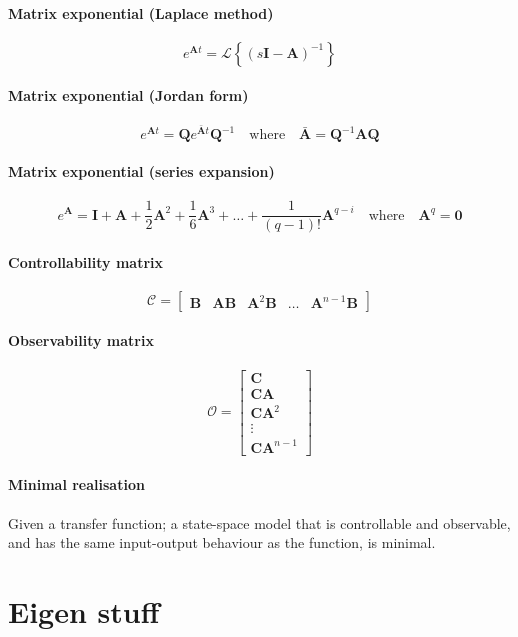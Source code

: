 \documentclass[a4paper]{article}
\newcommand{\M}[1]{\bm{#1}}
\newcommand{\Mc}[1]{\mathbf{#1}}
\newcommand{\lagrange}{\mathscr{L}}
\begin{document}
\paragraph{Matrix exponential (Laplace method)}
$$e^{\M{A}t} = \lagrange \left\{ (s\Mc{I}-\M{A})^{-1} \right\}$$

\paragraph{Matrix exponential (Jordan form)}
$$e^{\M{A}t} = \M{Q} e^{\bar{\M{A}}t} \M{Q}^{-1} \quad \text{where} \quad \bar{\M{A}} = \M{Q}^{-1}\M{AQ}$$

\paragraph{Matrix exponential (series expansion)}
$$
e^{\M{A}} = \Mc{I} + \M{A} + \frac{1}{2}\M{A}^2 + \frac{1}{6}\M{A}^3 + \dots + \frac{1}{(q-1)!}\M{A}^{q-i}
\quad \text{where} \quad
\M{A}^q = \Mc{0}
$$

\paragraph{Controllability matrix}
$$\mathcal{C} = \begin{bmatrix}\M{B} & \M{AB} & \M{A}^{2}\M{B} & \hdots & \M{A}^{n-1}\M{B}\end{bmatrix}$$

\paragraph{Observability matrix}
$$\mathcal{O} = \begin{bmatrix}\M{C} \\ \M{CA} \\ \M{CA}^2 \\ \vdots \\ \M{CA}^{n-1}\end{bmatrix}$$

\paragraph{Minimal realisation}
Given a transfer function; a state-space model that is controllable and observable, and has the same input-output behaviour as the function, is minimal.



\section{Eigen stuff}
\end{document}
